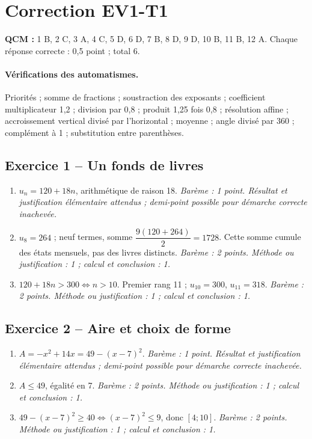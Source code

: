 \mxnewpage\section*{Correction EV1-T1}\label{EV1-T1-CORR}
\textbf{QCM :} 1 B, 2 C, 3 A, 4 C, 5 D, 6 D, 7 B, 8 D, 9 D, 10 B, 11 B, 12 A. Chaque réponse correcte : 0{,}5 point ; total 6.
\paragraph{Vérifications des automatismes.} Priorités ; somme de fractions ; soustraction des exposants ; coefficient multiplicateur 1{,}2 ; division par 0{,}8 ; produit 1{,}25 fois 0{,}8 ; résolution affine ; accroissement vertical divisé par l’horizontal ; moyenne ; angle divisé par 360 ; complément à 1 ; substitution entre parenthèses.
\subsection*{Exercice 1 -- Un fonds de livres}
\begin{enumerate}
\item $u_n=120+18n$, arithmétique de raison 18. \textit{Barème : 1 point. Résultat et justification élémentaire attendus ; demi-point possible pour démarche correcte inachevée.}
\item $u_8=264$ ; neuf termes, somme $\dfrac{9(120+264)}{2}=1728$. Cette somme cumule des états mensuels, pas des livres distincts. \textit{Barème : 2 points. Méthode ou justification : 1 ; calcul et conclusion : 1.}
\item $120+18n>300\iff n>10$. Premier rang 11 ; $u_{10}=300$, $u_{11}=318$. \textit{Barème : 2 points. Méthode ou justification : 1 ; calcul et conclusion : 1.}
\end{enumerate}
\subsection*{Exercice 2 -- Aire et choix de forme}
\begin{enumerate}
\item $A=-x^2+14x=49-(x-7)^2$. \textit{Barème : 1 point. Résultat et justification élémentaire attendus ; demi-point possible pour démarche correcte inachevée.}
\item $A\leq49$, égalité en 7. \textit{Barème : 2 points. Méthode ou justification : 1 ; calcul et conclusion : 1.}
\item $49-(x-7)^2\geq40\iff(x-7)^2\leq9$, donc $[4;10]$. \textit{Barème : 2 points. Méthode ou justification : 1 ; calcul et conclusion : 1.}
\end{enumerate}
